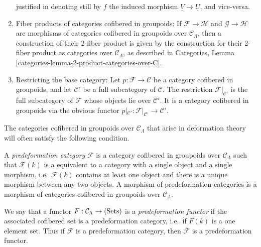 \begin{remarks}
\begin{enumerate}
justified in denoting still by $f$ the induced morphism $\underline{V} 
\rightarrow \underline{U}$, and vice-versa.
\item Fiber products of categories cofibered in groupoids: If $\mathcal F 
\rightarrow \mathcal H$ and $\mathcal G \rightarrow \mathcal H$ are morphisms 
of categories cofibered in groupoids over $\mathcal C_{\Lambda}$, then a 
construction of their 2-fiber product is given by the construction for their 
2-fiber product as categories over $\mathcal C_{\Lambda}$, as described in 
Categories, Lemma \ref{categories-lemma-2-product-categories-over-C}.
\item 
\label{definition-restricting-base-category}
Restricting the base category: Let $p : \mathcal F \rightarrow \mathcal C$ be a 
category cofibered in groupoids, and let $\mathcal C'$ be a full subcategory of 
$\mathcal C$.  The restriction $\mathcal F|_{\mathcal C'}$ is the full 
subcategory of $\mathcal F$ whose objects lie over $\mathcal C'$. It is a 
category cofibered in groupoids via the obvious functor $p|_{\mathcal C'}: 
\mathcal F|_{\mathcal C'} \rightarrow \mathcal C'$.
\end{enumerate}
\end{remarks}

\noindent
The categories cofibered in groupoids over $\mathcal C_{\Lambda}$ that arise in 
deformation theory will often satisfy the following condition.

\begin{definition}
\label{definition-predeformation-category}
A {\it predeformation category} $\mathcal F$ is a category cofibered in 
groupoids over $\mathcal C_{\Lambda}$ such that $\mathcal F(k)$ is a equivalent 
to a category with a single object and a single morphism, i.e.\ $\mathcal F(k)$ 
contains at least one object and there is a unique morphism between any two 
objects. A morphism of predeformation categories is a morphism of categories 
cofibered in groupoids over $\mathcal C_{\Lambda}$.
\end{definition}

\begin{remark}
\label{remark-predeformation-functor}
We say that a functor $F: \mathcal C_{\Lambda} \rightarrow \textnormal{(Sets)}$ 
is a {\it predeformation functor} if the associated cofibered set is a 
predeformation category, i.e.\ if $F(k)$ is a one element set.  Thus if 
$\mathcal F$ is a predeformation category, then $\overline{\mathcal F}$ is a 
predeformation functor.
\end{remark}

